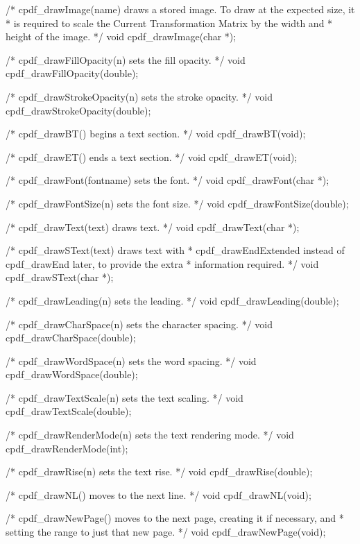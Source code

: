/* cpdf_drawImage(name) draws a stored image. To draw at the expected size, it
 * is required to scale the Current Transformation Matrix by the width and
 * height of the image. */
void cpdf_drawImage(char *);

/* cpdf_drawFillOpacity(n) sets the fill opacity. */
void cpdf_drawFillOpacity(double);

/* cpdf_drawStrokeOpacity(n) sets the stroke opacity. */
void cpdf_drawStrokeOpacity(double);

/* cpdf_drawBT() begins a text section. */
void cpdf_drawBT(void);

/* cpdf_drawET() ends a text section. */
void cpdf_drawET(void);

/* cpdf_drawFont(fontname) sets the font. */
void cpdf_drawFont(char *);

/* cpdf_drawFontSize(n) sets the font size. */
void cpdf_drawFontSize(double);

/* cpdf_drawText(text) draws text. */
void cpdf_drawText(char *);

/* cpdf_drawSText(text) draws text with %
 * cpdf_drawEndExtended instead of cpdf_drawEnd later, to provide the extra
 * information required. */
void cpdf_drawSText(char *);

/* cpdf_drawLeading(n) sets the leading. */
void cpdf_drawLeading(double);

/* cpdf_drawCharSpace(n) sets the character spacing. */
void cpdf_drawCharSpace(double);

/* cpdf_drawWordSpace(n) sets the word spacing. */
void cpdf_drawWordSpace(double);

/* cpdf_drawTextScale(n) sets the text scaling. */
void cpdf_drawTextScale(double);

/* cpdf_drawRenderMode(n) sets the text rendering mode. */
void cpdf_drawRenderMode(int);

/* cpdf_drawRise(n) sets the text rise. */
void cpdf_drawRise(double);

/* cpdf_drawNL() moves to the next line. */
void cpdf_drawNL(void);

/* cpdf_drawNewPage() moves to the next page, creating it if necessary, and
 * setting the range to just that new page. */
void cpdf_drawNewPage(void);

